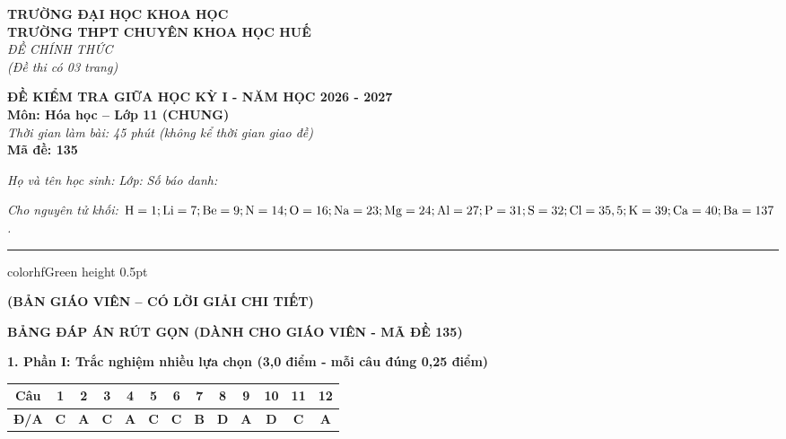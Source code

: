 \documentclass[11pt,a4paper]{article}
\begin{document}
\begin{minipage}[t]{0.48\textwidth}
\textbf{TRƯỜNG ĐẠI HỌC KHOA HỌC}\\
\textbf{TRƯỜNG THPT CHUYÊN KHOA HỌC HUẾ}\\
\textit{ĐỀ CHÍNH THỨC}\\
\textit{(Đề thi có 03 trang)}
\end{minipage}
\hfill
\begin{minipage}[t]{0.48\textwidth}
\raggedleft
\textbf{\color{hfRed}ĐỀ KIỂM TRA GIỮA HỌC KỲ I - NĂM HỌC 2026 - 2027}\\
\textbf{Môn: Hóa học -- Lớp 11 (CHUNG)}\\
\textit{Thời gian làm bài: 45 phút (không kể thời gian giao đề)}\\
\textbf{Mã đề: 135}
\end{minipage}

\vspace{4pt}
\noindent
\textit{Họ và tên học sinh:} \dotfill \textit{Lớp:} \dotfill \textit{Số báo danh:} \dotfill

\vspace{3pt}
\noindent
\textit{\footnotesize Cho nguyên tử khối: $\ce{H}=1; \ce{Li}=7; \ce{Be}=9; \ce{N}=14; \ce{O}=16; \ce{Na}=23; \ce{Mg}=24; \ce{Al}=27; \ce{P}=31; \ce{S}=32; \ce{Cl}=35,5; \ce{K}=39; \ce{Ca}=40; \ce{Ba}=137$.}

\vspace{3pt}
\hrule color{hfGreen} height 0.5pt

\vspace{4pt}
\begin{center}
\textbf{\color{hfRed}\large (BẢN GIÁO VIÊN -- CÓ LỜI GIẢI CHI TIẾT)}
\end{center}

\vspace{2pt}
\begin{center}
{\color{hfRed}\textbf{\large BẢNG ĐÁP ÁN RÚT GỌN (DÀNH CHO GIÁO VIÊN - MÃ ĐỀ 135)}}
\end{center}

\vspace{2pt}
\noindent
\textbf{\color{mainGreen}1. Phần I: Trắc nghiệm nhiều lựa chọn (3,0 điểm - mỗi câu đúng 0,25 điểm)}
\begin{center}
\renewcommand{\arraystretch}{1.2}
\begin{tabular}{|c|c|c|c|c|c|c|c|c|c|c|c|c|}
\hline
\rowcolor{tableGreen}
\textbf{Câu} & \textbf{1} & \textbf{2} & \textbf{3} & \textbf{4} & \textbf{5} & \textbf{6} & \textbf{7} & \textbf{8} & \textbf{9} & \textbf{10} & \textbf{11} & \textbf{12} \\
\hline
\textbf{Đ/A} & \textbf{\color{hfRed}C} & \textbf{\color{hfRed}A} & \textbf{\color{hfRed}C} & \textbf{\color{hfRed}A} & \textbf{\color{hfRed}C} & \textbf{\color{hfRed}C} & \textbf{\color{hfRed}B} & \textbf{\color{hfRed}D} & \textbf{\color{hfRed}A} & \textbf{\color{hfRed}D} & \textbf{\color{hfRed}C} & \textbf{\color{hfRed}A} \\
\hline
\end{tabular}
\end{center}
\end{document}
